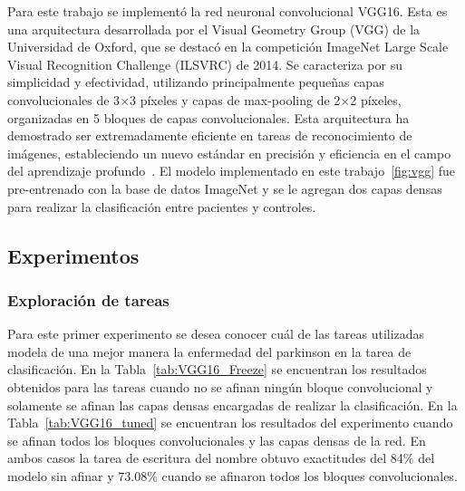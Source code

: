 \documentclass[10pt, a4paper]{article}
\begin{document}
Para este trabajo se implementó la red neuronal convolucional VGG16. Esta es una arquitectura 
desarrollada por el Visual Geometry Group (VGG) de la Universidad de Oxford, que se destacó 
en la competición ImageNet Large Scale Visual Recognition Challenge (ILSVRC) de 2014. Se 
caracteriza por su simplicidad y efectividad, utilizando principalmente pequeñas capas 
convolucionales de 3$\times$3 píxeles y capas de max-pooling de 2$\times$2 píxeles, organizadas en 5 bloques 
de capas convolucionales. Esta arquitectura ha demostrado ser 
extremadamente eficiente en tareas de reconocimiento de imágenes, estableciendo un nuevo 
estándar en precisión y eficiencia en el campo del aprendizaje profundo~\cite{ref9}. El modelo 
implementado en este trabajo~\ref*{fig:vgg} fue pre-entrenado con la base de datos ImageNet y se le agregan
dos capas densas para realizar la clasificación entre pacientes y controles. 


\subsection*{Experimentos}

\subsubsection*{Exploración de tareas}

Para este primer experimento se desea conocer cuál de las tareas utilizadas modela de una mejor manera
la enfermedad del parkinson en la tarea de clasificación. En la Tabla~\ref*{tab:VGG16_Freeze} se encuentran
los resultados obtenidos para las tareas cuando no se afinan ningún bloque convolucional y solamente se afinan
las capas densas encargadas de realizar la clasificación. En la Tabla~\ref*{tab:VGG16_tuned} se encuentran 
los resultados del experimento cuando se afinan todos los bloques convolucionales y las capas densas de la red.
En ambos casos la tarea de escritura del nombre obtuvo exactitudes del 84\% del modelo sin afinar y 73.08\%
cuando se afinaron todos los bloques convolucionales.
\end{document}
